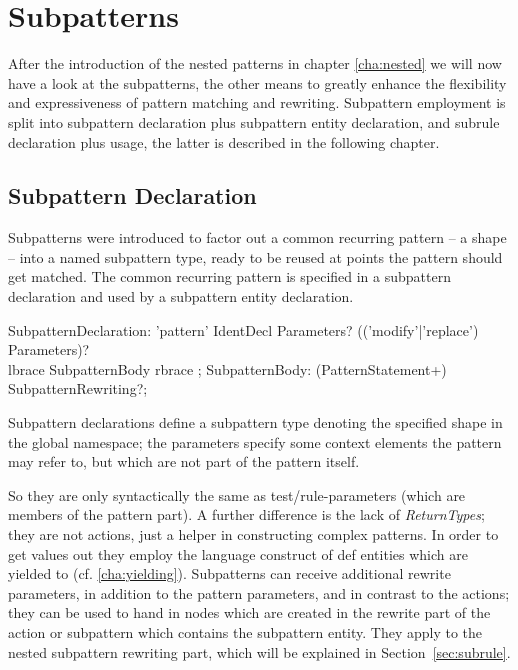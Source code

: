 \chapter{Subpatterns}
\label{cha:sub}

After the introduction of the nested patterns in chapter \ref{cha:nested} we will now have a look at the subpatterns, the other means to greatly enhance the flexibility and expressiveness of pattern matching and rewriting.
Subpattern employment is split into subpattern declaration plus subpattern entity declaration, and subrule declaration plus usage, the latter is described in the following chapter.

\section{Subpattern Declaration}
\label{sec:subpattern}

Subpatterns were introduced to factor out a common recurring pattern -- a shape -- into a named subpattern type, ready to be reused at points the pattern should get matched.
The common recurring pattern is specified in a subpattern declaration and used by a subpattern entity declaration.

\begin{rail}  
  SubpatternDeclaration: 
    'pattern' IdentDecl Parameters? (('modify'|'replace') Parameters)? \\
	lbrace SubpatternBody rbrace ;
  SubpatternBody: (PatternStatement+) SubpatternRewriting?;
\end{rail}\label{subpatterndecl}

Subpattern declarations define a subpattern type denoting the specified shape in the global namespace;
the parameters specify some context elements the pattern may refer to, but which are not part of the pattern itself. 

So they are only syntactically the same as test/rule-parameters (which are members of the pattern part).
A further difference is the lack of \emph{ReturnTypes}; they are not actions, just a helper in constructing complex patterns.
In order to get values out they employ the language construct of def entities which are yielded to (cf. \ref{cha:yielding}).
Subpatterns can receive additional rewrite parameters, in addition to the pattern parameters, and in contrast to the actions; they can be used to hand in nodes which are created in the rewrite part of the action or subpattern which contains the subpattern entity.
They apply to the nested subpattern rewriting part, which will be explained in Section~\ref{sec:subrule}.


